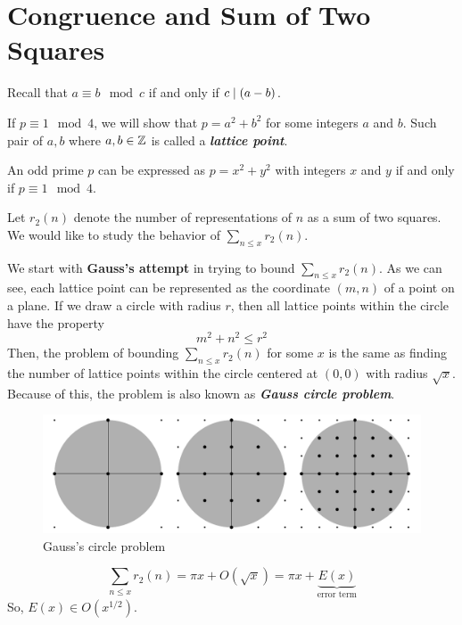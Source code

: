 



\section{Congruence and Sum of Two Squares}

Recall that $a \equiv b \mod c$ if and only if $c \mathrel{\mid} (a-b)$. 

If $p \equiv 1 \mod 4$, we will show that $p = a^2 + b^2$ for some integers $a$ and $b$. Such pair of $a,b$ where $a,b \in \mathbb{Z}$ is called a \textit{\textbf{lattice point}}.

\begin{theorem}
    An odd prime $p$ can be expressed as $p = x^2 + y^2$ with integers $x$ and $y$ if and only if $p \equiv 1 \mod 4$.
\end{theorem}

Let $r_2(n)$ denote the number of representations of $n$ as a sum of two squares. We would like to study the behavior of $\sum_{n \leq x} r_2(n)$.

We start with \textbf{Gauss's attempt} in trying to bound $\sum_{n \leq x} r_2(n)$. As we can see, each lattice point can be represented as the coordinate $(m,n)$ of a point on a plane. If we draw a circle with radius $r$, then all lattice points within the circle have the property
$$
m^2 + n^2 \leq r^2
$$
Then, the problem of bounding $\sum_{n\leq x}r_2(n)$ for some $x$ is the same as finding the number of lattice points within the circle centered at $(0,0)$ with radius $\sqrt{x}$. Because of this, the problem is also known as \textit{\textbf{Gauss circle problem}}.

\begin{figure}[htbp]
    \centering
    \includegraphics[width=0.5\linewidth]{figures/GausssCircleProblem.pdf}
    \caption{Gauss's circle problem}
    \label{fig:gauss-circle-prob}
\end{figure}

\begin{theorem}
    $$
    \sum_{n \leq x} r_2(n) = \pi x + O(\sqrt{x}) = \pi x + \underbrace{E(x)}_{\text{error term}}
    $$
    So, $E(x) \in O(x^{1/2})$.
\end{theorem}

